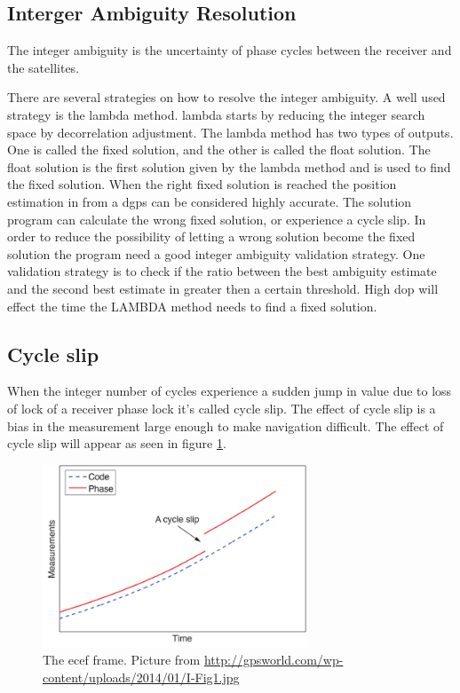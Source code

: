 \subsection{Interger Ambiguity Resolution}
The integer ambiguity is the uncertainty of phase cycles between the receiver and the satellites.

There are several strategies on how to resolve the integer ambiguity. A well used strategy is the \gls{lambda} method. \gls{lambda} starts by reducing the integer search space by decorrelation adjustment. The \gls{lambda} method has two types of outputs. One is called the fixed solution, and the other is called the float solution. The float solution is the first solution given by the \gls{lambda} method and is used to find the fixed solution. When the right fixed solution is reached the position estimation in from a \gls{dgps} can be considered highly accurate. The solution program can calculate the wrong fixed solution, or experience a cycle slip. In order to reduce the possibility of letting a wrong solution become the fixed solution the program need a good integer ambiguity validation strategy. One validation strategy is to check if the ratio between the best ambiguity estimate and the second best estimate in greater then a certain threshold. High \gls{dop} will effect the time the LAMBDA method needs to find a fixed solution.

\subsection{Cycle slip}
When the integer number of cycles experience a sudden jump in value due to loss of lock of a receiver phase lock it's called cycle slip. The effect of cycle slip is a bias in the measurement large enough to make navigation difficult. The effect of cycle slip will appear as seen in figure \ref{figure:CycleSlip}.
\begin{figure}[H]
	\centering
		\includegraphics[width=0.7\textwidth]{figs/cycleSlip.jpg}
		\caption{The \gls{ecef} frame. Picture from \url{http://gpsworld.com/wp-content/uploads/2014/01/I-Fig1.jpg}}
		\label{figure:CycleSlip}
\end{figure}
